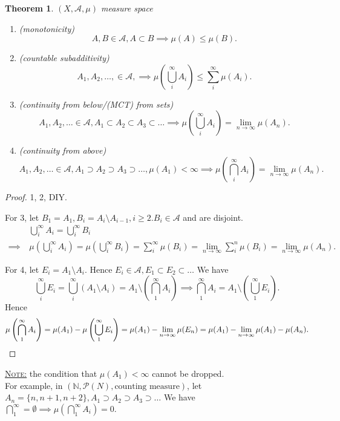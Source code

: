 \documentclass{report}
\newcommand{\N}{\mathbb{N}}
\newcommand{\fancyem}[1]{\underline{\textsc{#1}}}
\newtheorem{theorem}{Theorem}[chapter]
\theoremstyle{definition}
\theoremstyle{remark}
\begin{document}
\setcounter{theorem}{12}
\begin{theorem}
$(X,  \mathcal{A}, \mu)$ measure space
\begin{enumerate}
\item(monotonicity)
\[A, B \in \mathcal{A}, A \subset B \implies \mu(A) \leq \mu(B).\]
\item(countable subadditivity)
	\[A_1, A_2, \ldots, \in \mathcal{A}, \implies \mu\left(\bigcup_i^\infty A_i\right) \leq \sum_i^\infty \mu(A_i).\]
\item(continuity from below/(MCT) from sets)
	\[A_1, A_2, \ldots \in \mathcal{A}, A_1 \subset A_2 \subset A_3 \subset \ldots \implies \mu\left(\bigcup_i^\infty A_i\right) = \lim_{n \to \infty} \mu(A_n).\]
\item(continuity from above)
	\[A_1, A_2, \ldots \in \mathcal{A}, A_1 \supset A_2 \supset A_3 \supset \ldots, \mu(A_1) < \infty \implies \mu\left(\bigcap_i^\infty A_i\right) = \lim_{n \to \infty} \mu(A_n).\]
\end{enumerate}
\end{theorem}
\begin{proof}
1, 2, DIY.

For 3, let $B_1 = A_1, B_i = A_i \setminus A_{i-1}, i \geq 2. B_i \in \mathcal{A}$ and are disjoint.
\begin{align*}
& \bigcup_i^\infty A_i = \bigcup_i^\infty B_i \\
\implies\ & \mu\left(\bigcup_i^\infty A_i\right) = \mu\left(\bigcup_i^\infty B_i\right) = \sum_{i}^\infty \mu(B_i) = \lim_{n \to \infty} \sum_{i}^n \mu(B_i) = \lim_{n \to \infty} \mu(A_n).
\end{align*}


For 4, let $E_i = A_1 \setminus A_i.$ Hence $E_i \in \mathcal{A}, E_1 \subset E_2 \subset \ldots$
We have
\[
\bigcup_i^\infty E_i = \bigcup_i^\infty (A_1 \setminus A_i) = A_1 \setminus \left(\bigcap_1^\infty A_i\right) \implies \bigcap_1^\infty A_i = A_1 \setminus \left(\bigcup_1^\infty E_i\right).
\]
Hence
\[
\mu\left(\bigcap_1^\infty A_i \right) = \mu(A_1) - \mu\left(\bigcup_1^\infty E_i\right) = \mu(A_1) - \lim_{n\to \infty}\mu(E_n) = \mu(A_1) - \lim_{n\to \infty} \mu(A_1) - \mu(A_n). \qedhere
\]
\end{proof}

\fancyem{Note:} the condition that $\mu(A_1) < \infty$ cannot be dropped. \\
For example,
in $(\N, \mathcal{P}(N), \text{counting measure})$, let $A_n = \{n, n+1, n+2\}, A_1 \supset A_2 \supset A_3 \supset \ldots$ We have $\bigcap_1^\infty = \emptyset \implies \mu\left(\bigcap_1^\infty A_i \right) = 0.$
\end{document}
